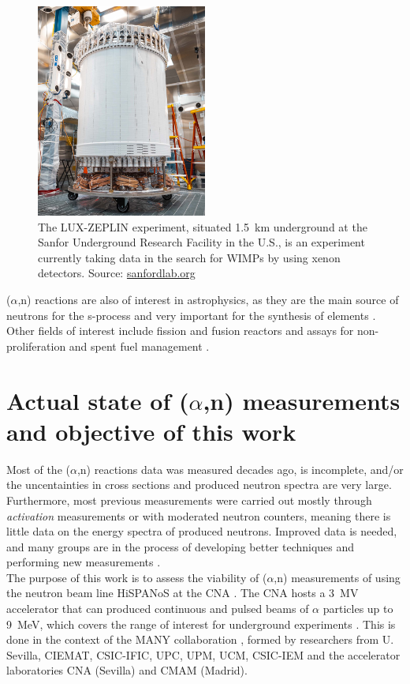 \documentclass[a4paper,12pt]{report}
\newcommand{\an}{($\alpha$,n) }
\begin{document}
\begin{figure}[H]
	\centering
	\includegraphics[width=0.5\textwidth]{sanford.jpg}
	\caption{The LUX-ZEPLIN experiment, situated \qty{1.5}{\kilo\meter} underground at the Sanfor Underground Research Facility in the U.S., is an experiment currently taking data in the search for WIMPs by using xenon detectors.
	Source: \href{https://sanfordlab.org/experiment/lux-zeplin}{sanfordlab.org}}
	\label{sanford}
\end{figure}

\an reactions are also of interest in astrophysics, as they are the main source of neutrons for the s-process and very important for the synthesis of elements \cite{astro1, astro2}.
Other fields of interest include fission and fusion reactors and assays for non-proliferation and spent fuel management \cite{INDC}.

\section{Actual state of \an measurements and objective of this work}
Most of the \an reactions data was measured decades ago, is incomplete, and/or the uncentainties in cross sections and produced neutron spectra are very large.
Furthermore, most previous measurements were carried out mostly through \textit{activation} measurements or with moderated neutron counters, meaning there is little data on the energy spectra of produced neutrons.
Improved data is needed, and many groups are in the process of developing better techniques and performing new measurements \cite{INDC}.
\\

The purpose of this work is to assess the viability of \an measurements of using the neutron beam line HiSPANoS at the CNA \cite{CNA}.
The CNA hosts a \qty{3}{\mega\volt} accelerator that can produced continuous and pulsed beams of $\alpha$ particles up to \qty{9}{\MeV}, which covers the range of interest for underground experiments \cite{hispanos}.
This is done in the context of the MANY collaboration \cite{MANY}, formed by researchers from U. Sevilla, CIEMAT, CSIC-IFIC, UPC, UPM, UCM, CSIC-IEM and the accelerator laboratories CNA (Sevilla) and CMAM (Madrid).
\\
\end{document}

